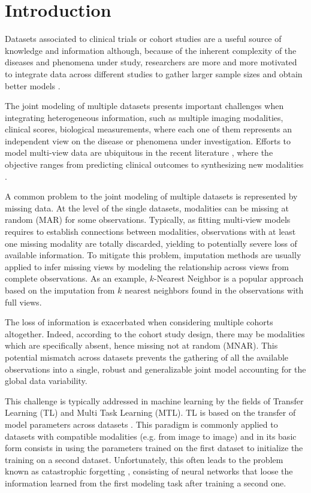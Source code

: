 \section{Introduction}

Datasets associated to clinical trials or cohort studies are a useful source of knowledge and information although,
because of the inherent complexity of the diseases and phenomena under study,
researchers are more and more motivated to integrate data across different studies to gather larger sample sizes and obtain better models \citep{LeSueur2020}.

The joint modeling of multiple datasets presents important challenges when integrating heterogeneous information, such as multiple imaging modalities, clinical scores, biological measurements, where each one of them represents an independent view on the disease or phenomena under investigation.
Efforts to model multi-view data are ubiquitous in the recent literature \citep{Vieira2020}, where the objective ranges from predicting clinical outcomes \citep{Chen2019} to synthesizing new modalities \citep{Zhou2020, Wei2019}.

A common problem to the joint modeling of multiple datasets is represented by missing data.
At the level of the single datasets, modalities can be missing at random (MAR) for some observations.
Typically, as fitting multi-view models requires to establish connections between modalities, observations with at least one missing modality are totally discarded, yielding to potentially severe loss of available information.
To mitigate this problem, imputation methods are usually applied to infer missing views by modeling the relationship across views from complete observations.
As an example, $k$-Nearest Neighbor is a popular approach based on the imputation from $k$ nearest neighbors found in the observations with full views.

The loss of information is exacerbated when considering multiple cohorts altogether.
Indeed, according to the cohort study design, there may be modalities which are specifically absent, hence missing not at random (MNAR).
This potential mismatch across datasets prevents the gathering of all the available observations into a single, robust and generalizable joint model accounting for the global data variability.

This challenge is typically addressed in machine learning by the fields of Transfer Learning (TL) and Multi Task Learning (MTL).
TL is based on the transfer of model parameters across datasets \citep{TL}.
This paradigm is commonly applied to datasets with compatible modalities (e.g. from image to image) and in its basic form consists in using the parameters trained on the first dataset to initialize the training on a second dataset.
Unfortunately, this often leads to the problem known as catastrophic forgetting \citep{CatastroficForgetting}, consisting of neural networks that loose the information learned from the first modeling task after training a second one.

